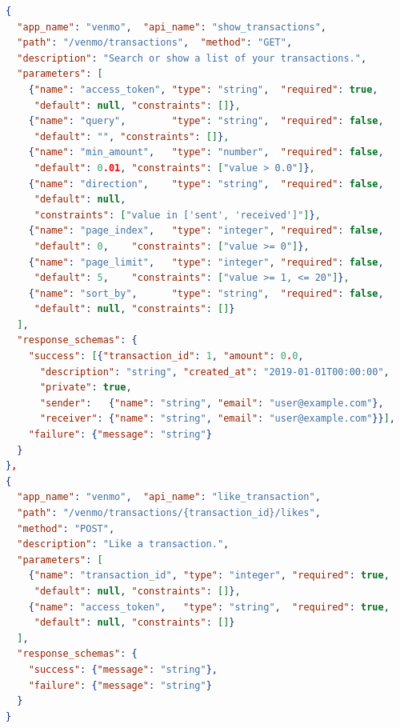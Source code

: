 \documentclass[11pt]{article}
\begin{document}
\begin{lstlisting}[language=json,
  caption={Two of the six Venmo APIs provided as few-shot structural examples to Gemini: a complex list endpoint with filters and pagination (top) and a stateful sub-resource action (bottom). These two examples illustrate the range of structural patterns Gemini is expected to replicate.},
  label={lst:example_apis}]
{
  "app_name": "venmo",  "api_name": "show_transactions",
  "path": "/venmo/transactions",  "method": "GET",
  "description": "Search or show a list of your transactions.",
  "parameters": [
    {"name": "access_token", "type": "string",  "required": true,
     "default": null, "constraints": []},
    {"name": "query",        "type": "string",  "required": false,
     "default": "", "constraints": []},
    {"name": "min_amount",   "type": "number",  "required": false,
     "default": 0.01, "constraints": ["value > 0.0"]},
    {"name": "direction",    "type": "string",  "required": false,
     "default": null,
     "constraints": ["value in ['sent', 'received']"]},
    {"name": "page_index",   "type": "integer", "required": false,
     "default": 0,    "constraints": ["value >= 0"]},
    {"name": "page_limit",   "type": "integer", "required": false,
     "default": 5,    "constraints": ["value >= 1, <= 20"]},
    {"name": "sort_by",      "type": "string",  "required": false,
     "default": null, "constraints": []}
  ],
  "response_schemas": {
    "success": [{"transaction_id": 1, "amount": 0.0,
      "description": "string", "created_at": "2019-01-01T00:00:00",
      "private": true,
      "sender":   {"name": "string", "email": "user@example.com"},
      "receiver": {"name": "string", "email": "user@example.com"}}],
    "failure": {"message": "string"}
  }
},
{
  "app_name": "venmo",  "api_name": "like_transaction",
  "path": "/venmo/transactions/{transaction_id}/likes",
  "method": "POST",
  "description": "Like a transaction.",
  "parameters": [
    {"name": "transaction_id", "type": "integer", "required": true,
     "default": null, "constraints": []},
    {"name": "access_token",   "type": "string",  "required": true,
     "default": null, "constraints": []}
  ],
  "response_schemas": {
    "success": {"message": "string"},
    "failure": {"message": "string"}
  }
}
\end{lstlisting}
\end{document}
